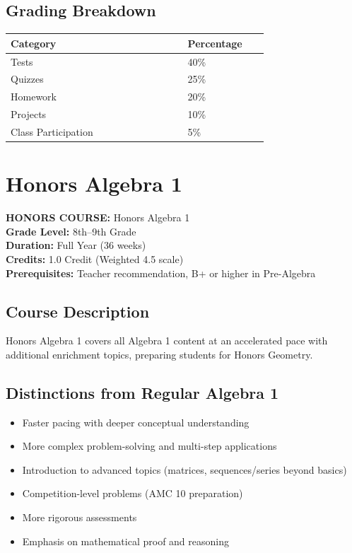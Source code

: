 \documentclass[12pt,oneside]{book}
\begin{document}
\section{Grading Breakdown}
\begin{center}
\begin{tabular}{L{0.55\linewidth}L{0.25\linewidth}}
\toprule
\textbf{Category} & \textbf{Percentage} \\
\midrule
Tests & 40\% \\
Quizzes & 25\% \\
Homework & 20\% \\
Projects & 10\% \\
Class Participation & 5\% \\
\bottomrule
\end{tabular}
\end{center}

\chapter{Honors Algebra 1}

\noindent\textbf{HONORS COURSE:} Honors Algebra 1\\
\textbf{Grade Level:} 8th--9th Grade\\
\textbf{Duration:} Full Year (36 weeks)\\
\textbf{Credits:} 1.0 Credit (Weighted 4.5 scale)\\
\textbf{Prerequisites:} Teacher recommendation, B+ or higher in Pre-Algebra

\section{Course Description}
Honors Algebra 1 covers all Algebra 1 content at an accelerated pace with additional enrichment topics,
preparing students for Honors Geometry.

\section{Distinctions from Regular Algebra 1}
\begin{itemize}[leftmargin=2em]
    \item Faster pacing with deeper conceptual understanding
    \item More complex problem-solving and multi-step applications
    \item Introduction to advanced topics (matrices, sequences/series beyond basics)
    \item Competition-level problems (AMC 10 preparation)
    \item More rigorous assessments
    \item Emphasis on mathematical proof and reasoning
\end{itemize}
\end{document}
